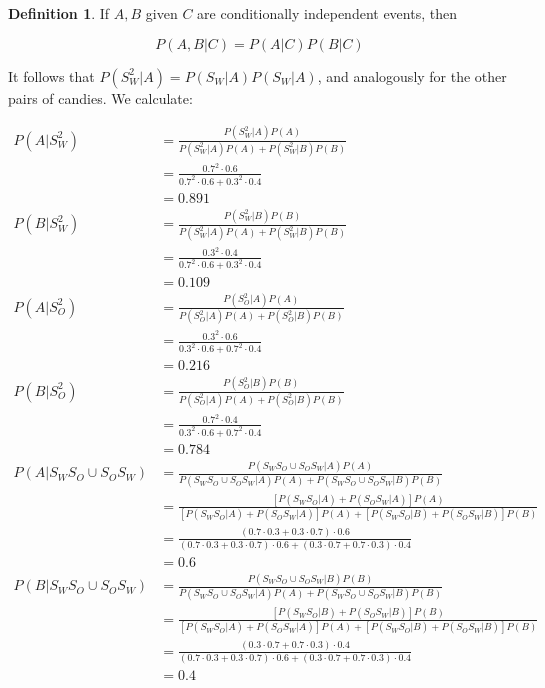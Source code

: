 \documentclass[10pt, oneside]{article}   	%
\theoremstyle{definition}
\newtheorem*{defn}{Definition}
\begin{document}
\begin{enumerate}[label=3.\arabic*]
\begin{defn} If $A, B$ given $C$ are conditionally independent events, then 

\[ P(A, B | C) = P(A | C) P(B | C) \]
\end{defn}

It follows that $P(S^2_W | A) = P(S_W | A) P(S_W | A)$, and analogously for the other pairs of candies. We calculate:

\begin{align*}
P(A | S^2_W) &= \frac{P(S^2_W | A) P(A) }{P(S^2_W | A) P(A) + P(S^2_W | B) P(B)} \\
&= \frac{0.7^2 \cdot 0.6 }{ 0.7^2 \cdot 0.6 + 0.3^2 \cdot 0.4} \\
&= \boxed{0.891} \\
P(B | S^2_W) &= \frac{P(S^2_W | B) P(B) }{P(S^2_W | A) P(A) + P(S^2_W | B) P(B)} \\
&= \frac{0.3^2 \cdot 0.4 }{ 0.7^2 \cdot 0.6 + 0.3^2 \cdot 0.4} \\
&= \boxed{0.109} \\
P(A | S^2_O) &= \frac{P(S^2_O | A) P(A) }{P(S^2_O | A) P(A) + P(S^2_O | B) P(B)} \\
&= \frac{0.3^2 \cdot 0.6 }{ 0.3^2 \cdot 0.6 + 0.7^2 \cdot 0.4} \\
&= \boxed{0.216} \\
P(B | S^2_O) &= \frac{P(S^2_O | B) P(B) }{P(S^2_O | A) P(A) + P(S^2_O | B) P(B)} \\
&= \frac{0.7^2 \cdot 0.4 }{ 0.3^2 \cdot 0.6 + 0.7^2 \cdot 0.4} \\
&= \boxed{0.784} \\
P(A | S_W S_O \cup S_O S_W) &= \frac{P(S_W S_O \cup S_O S_W | A) P(A)}{P(S_W S_O \cup S_O S_W | A) P(A) + P(S_W S_O \cup S_O S_W | B) P(B)} \\
&= \frac{ [ P(S_W S_O | A) + P(S_O S_W | A) ] P(A)}{ [ P(S_W S_O | A) + P(S_O S_W | A) ] P(A) + [ P(S_W S_O | B) + P(S_O S_W | B) ] P(B)} \\
&= \frac{ (0.7 \cdot 0.3 + 0.3 \cdot 0.7) \cdot 0.6}{ (0.7 \cdot 0.3 + 0.3 \cdot 0.7) \cdot 0.6 + (0.3 \cdot 0.7 + 0.7 \cdot 0.3) \cdot 0.4 } \\
&= \boxed{0.6} \\
P(B | S_W S_O \cup S_O S_W) &= \frac{P(S_W S_O \cup S_O S_W | B) P(B)}{P(S_W S_O \cup S_O S_W | A) P(A) + P(S_W S_O \cup S_O S_W | B) P(B)} \\
&= \frac{ [ P(S_W S_O | B) + P(S_O S_W | B) ] P(B)}{ [ P(S_W S_O | A) + P(S_O S_W | A) ] P(A) + [ P(S_W S_O | B) + P(S_O S_W | B) ] P(B)} \\
&= \frac{ (0.3 \cdot 0.7 + 0.7 \cdot 0.3) \cdot 0.4}{ (0.7 \cdot 0.3 + 0.3 \cdot 0.7) \cdot 0.6 + (0.3 \cdot 0.7 + 0.7 \cdot 0.3) \cdot 0.4 } \\
&= \boxed{0.4}
\end{align*}


\end{enumerate}
\end{document}
